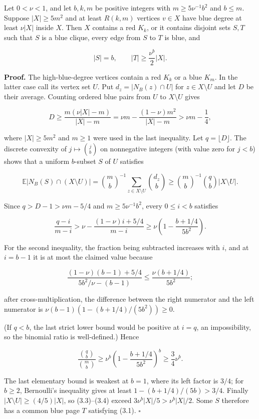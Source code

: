 Let \(0<\nu<1\), and let \(b,k,m\) be positive integers with
\(m\ge5\nu^{-1}b^2\) and \(b\le m\). Suppose \(|X|\ge5m^2\) and at least
\(R(k,m)\) vertices \(v\in X\) have blue degree at least \(\nu|X|\)
inside \(X\). Then \(X\) contains a red \(K_k\), or it contains disjoint
sets \(S,T\) such that \(S\) is a blue clique, every edge from \(S\) to
\(T\) is blue, and

\[
|S|=b,\qquad |T|\ge\frac{\nu^b}{2}|X|.
\tag{3.1}
\]

\textbf{Proof.} The high-blue-degree vertices contain a red \(K_k\) or a
blue \(K_m\). In the latter case call its vertex set \(U\). Put
\(d_z=|N_B(z)\cap U|\) for \(z\in X\setminus U\) and let \(D\) be their
average. Counting ordered blue pairs from \(U\) to \(X\setminus U\)
gives

\[
D\ge\frac{m(\nu|X|-m)}{|X|-m}
=\nu m-\frac{(1-\nu)m^2}{|X|-m}
>\nu m-\frac14,
\tag{3.2}
\]

where \(|X|\ge5m^2\) and \(m\ge1\) were used in the last inequality. Let
\(q=\lfloor D\rfloor\). The discrete convexity of \(j\mapsto\binom jb\)
on nonnegative integers (with value zero for \(j<b\)) shows that a
uniform \(b\)-subset \(S\) of \(U\) satisfies

\[
\mathbb E|N_B(S)\cap(X\setminus U)|
=\binom mb^{-1}\sum_{z\in X\setminus U}\binom{d_z}b
\ge\binom mb^{-1}\binom qb|X\setminus U|.
\tag{3.3}
\]

Since \(q>D-1>\nu m-5/4\) and \(m\ge5\nu^{-1}b^2\), every \(0\le i<b\)
satisfies

\[
\frac{q-i}{m-i}
>\nu-\frac{(1-\nu)i+5/4}{m-i}
\ge\nu\left(1-\frac{b+1/4}{5b^2}\right).
\]

For the second inequality, the fraction being subtracted increases with
\(i\), and at \(i=b-1\) it is at most the claimed value because

\[
\frac{(1-\nu)(b-1)+5/4}{5b^2/\nu-(b-1)}
\le\frac{\nu(b+1/4)}{5b^2};
\]

after cross-multiplication, the difference between the right numerator
and the left numerator is \(\nu(b-1)(1-(b+1/4)/(5b^2))\ge0\).

(If \(q<b\), the last strict lower bound would be positive at \(i=q\),
an impossibility, so the binomial ratio is well-defined.) Hence

\[
\frac{\binom qb}{\binom mb}
\ge\nu^b\left(1-\frac{b+1/4}{5b^2}\right)^b
\ge\frac34\nu^b.
\tag{3.4}
\]

The last elementary bound is weakest at \(b=1\), where its left factor
is \(3/4\); for \(b\ge2\), Bernoulli's inequality gives at least
\(1-(b+1/4)/(5b)>3/4\). Finally \(|X\setminus U|\ge(4/5)|X|\), so
(3.3)--(3.4) exceed \(3\nu^b|X|/5>\nu^b|X|/2\). Some \(S\) therefore has
a common blue page \(T\) satisfying (3.1). \(\square\)


